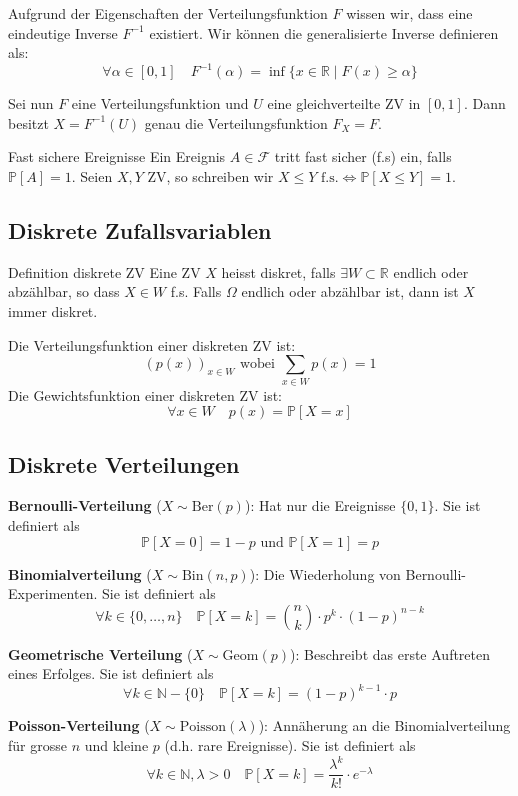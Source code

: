 \documentclass[a4paper,10pt]{article}
\def\R{\mathbb{R}}
\def\P{\mathbb{P}}
\def\F{\mathcal{F}}
\begin{document}
Aufgrund der Eigenschaften der Verteilungsfunktion \(F\) wissen wir, dass eine eindeutige Inverse $F^{-1}$ existiert. Wir können die generalisierte Inverse definieren als: \[\forall \alpha \in [0,1] \quad F^{-1}(\alpha) = \inf \{x \in \R \mid F(x) \geq \alpha\}\]

Sei nun \(F\) eine Verteilungsfunktion und \(U\) eine gleichverteilte ZV in \([0,1]\). Dann besitzt \(X = F^{-1}(U)\) genau die Verteilungsfunktion \(F_X = F\).

\begin{subbox}{Fast sichere Ereignisse}
	Ein Ereignis \(A \in \F\) tritt fast sicher (f.s) ein, falls \(\P[A] = 1\). Seien \(X, Y\) ZV, so schreiben wir \(X \le Y \text{ f.s.} \iff \P[X\le Y] = 1\).
\end{subbox}

\subsection{Diskrete Zufallsvariablen}
\begin{subbox}{Definition diskrete ZV}
	Eine ZV \(X\) heisst diskret, falls \(\exists W \subset \R\) endlich oder abzählbar, so dass \(X \in W\) f.s. Falls \(\Omega\) endlich oder abzählbar ist, dann ist \(X\) immer diskret.
\end{subbox}
\noindent Die Verteilungsfunktion einer diskreten ZV ist:
\[(p(x))_{x \in W} \text{ wobei } \sum_{x\in W} p(x) = 1\]
Die Gewichtsfunktion einer diskreten ZV ist:
\[\forall x \in W \quad p(x) = \P[X=x]\]

\subsection{Diskrete Verteilungen}
\textbf{Bernoulli-Verteilung} (\(X \sim \text{Ber}(p)\)): Hat nur die Ereignisse \(\{0,1\}\). Sie ist definiert als
\[\P[X=0] = 1-p \text{ und } \P[X=1]=p\]

\noindent \textbf{Binomialverteilung} (\(X \sim \text{Bin}(n,p)\)): Die Wiederholung von Bernoulli-Experimenten. Sie ist definiert als
\[\forall k \in \{0, \ldots, n\} \quad \P[X=k] = \binom{n}{k} \cdot p^k \cdot (1-p)^{n-k}\]

\noindent \textbf{Geometrische Verteilung} (\(X \sim \text{Geom}(p)\)): Beschreibt das erste Auftreten eines Erfolges. Sie ist definiert als
\[\forall k \in \mathbb{N} - \{0\} \quad \P[X=k]=(1-p)^{k-1}\cdot p\]

\noindent \textbf{Poisson-Verteilung} (\(X \sim \text{Poisson}(\lambda)\)): Annäherung an die Binomialverteilung für grosse \(n\) und kleine \(p\) (d.h. rare Ereignisse). Sie ist definiert als
\[\forall k \in \mathbb{N}, \lambda > 0 \quad \P[X=k]=\frac{\lambda^k}{k!}\cdot e^{-\lambda}\]
\end{document}
